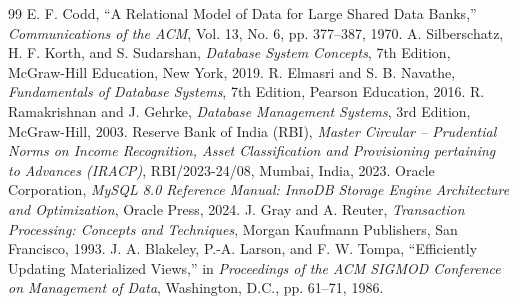 \documentclass[11pt,a4paper]{report}
\begin{document}
\begin{thebibliography}{99}
     E. F. Codd, ``A Relational Model of Data for Large Shared Data Banks,'' \textit{Communications of the ACM}, Vol. 13, No. 6, pp. 377--387, 1970.
     A. Silberschatz, H. F. Korth, and S. Sudarshan, \textit{Database System Concepts}, 7th Edition, McGraw-Hill Education, New York, 2019.
     R. Elmasri and S. B. Navathe, \textit{Fundamentals of Database Systems}, 7th Edition, Pearson Education, 2016.
     R. Ramakrishnan and J. Gehrke, \textit{Database Management Systems}, 3rd Edition, McGraw-Hill, 2003.
     Reserve Bank of India (RBI), \textit{Master Circular -- Prudential Norms on Income Recognition, Asset Classification and Provisioning pertaining to Advances (IRACP)}, RBI/2023-24/08, Mumbai, India, 2023.
     Oracle Corporation, \textit{MySQL 8.0 Reference Manual: InnoDB Storage Engine Architecture and Optimization}, Oracle Press, 2024.
     J. Gray and A. Reuter, \textit{Transaction Processing: Concepts and Techniques}, Morgan Kaufmann Publishers, San Francisco, 1993.
     J. A. Blakeley, P.-A. Larson, and F. W. Tompa, ``Efficiently Updating Materialized Views,'' in \textit{Proceedings of the ACM SIGMOD Conference on Management of Data}, Washington, D.C., pp. 61--71, 1986.
\end{thebibliography}
\end{document}
